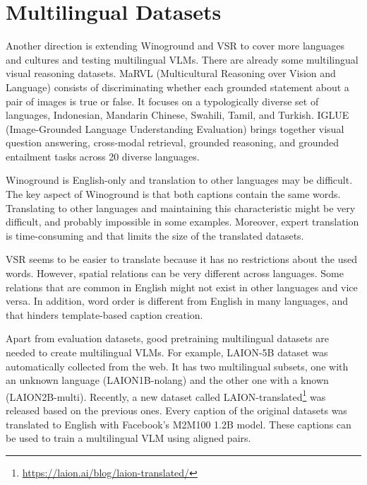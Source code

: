 \section{Multilingual Datasets} \label{sec:multilingual_datasets}

Another direction is extending Winoground and VSR to cover more languages and cultures and testing multilingual VLMs. There are already some multilingual visual reasoning datasets. MaRVL (Multicultural Reasoning over Vision and Language) \cite{liu-etal-2021-visually} consists of discriminating whether each grounded statement about a pair of images is true or false. It focuses on a typologically diverse set of languages, Indonesian, Mandarin Chinese, Swahili, Tamil, and Turkish. IGLUE (Image-Grounded Language Understanding Evaluation) \cite{bugliarello2022iglue} brings together visual question answering, cross-modal retrieval, grounded reasoning, and grounded entailment tasks across 20 diverse languages.

Winoground is English-only and translation to other languages may be difficult. The key aspect of Winoground is that both captions contain the same words. Translating to other languages and maintaining this characteristic might be very difficult, and probably impossible in some examples. Moreover, expert translation is time-consuming and that limits the size of the translated datasets. 

VSR seems to be easier to translate because it has no restrictions about the used words. However, spatial relations can be very different across languages. Some relations that are common in English might not exist in other languages and vice versa. In addition, word order is different from English in many languages, and that hinders template-based caption creation.

Apart from evaluation datasets, good pretraining multilingual datasets are needed to create multilingual VLMs. For example, LAION-5B \cite{schuhmann2022laionb} dataset was automatically collected from the web. It has two multilingual subsets, one with an unknown language (LAION1B-nolang) and the other one with a known (LAION2B-multi). Recently, a new dataset called LAION-translated\footnote{\url{https://laion.ai/blog/laion-translated/}} was released based on the previous ones. Every caption of the original datasets was translated to English with Facebook’s M2M100 1.2B model. These captions can be used to train a multilingual VLM using aligned pairs.


